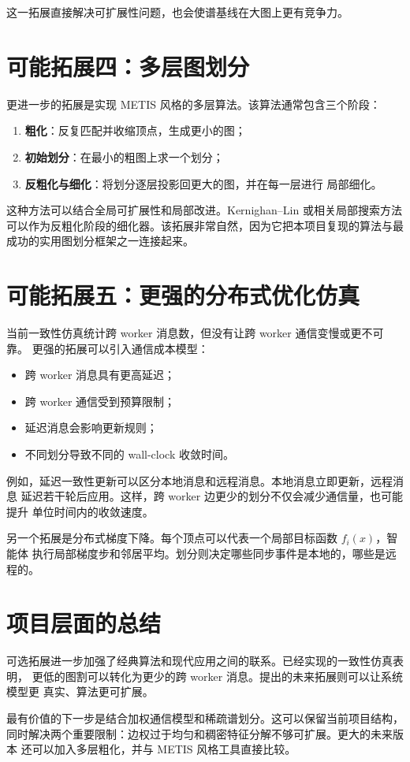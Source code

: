 \documentclass[UTF8, 11pt]{ctexart}
\begin{document}
这一拓展直接解决可扩展性问题，也会使谱基线在大图上更有竞争力。

\section{可能拓展四：多层图划分}

更进一步的拓展是实现 METIS 风格的多层算法。该算法通常包含三个阶段：
\begin{enumerate}
    \item \textbf{粗化}：反复匹配并收缩顶点，生成更小的图；
    \item \textbf{初始划分}：在最小的粗图上求一个划分；
    \item \textbf{反粗化与细化}：将划分逐层投影回更大的图，并在每一层进行
    局部细化。
\end{enumerate}

这种方法可以结合全局可扩展性和局部改进。Kernighan--Lin 或相关局部搜索方法
可以作为反粗化阶段的细化器。该拓展非常自然，因为它把本项目复现的算法与最
成功的实用图划分框架之一连接起来。

\section{可能拓展五：更强的分布式优化仿真}

当前一致性仿真统计跨 worker 消息数，但没有让跨 worker 通信变慢或更不可靠。
更强的拓展可以引入通信成本模型：
\begin{itemize}
    \item 跨 worker 消息具有更高延迟；
    \item 跨 worker 通信受到预算限制；
    \item 延迟消息会影响更新规则；
    \item 不同划分导致不同的 wall-clock 收敛时间。
\end{itemize}

例如，延迟一致性更新可以区分本地消息和远程消息。本地消息立即更新，远程消息
延迟若干轮后应用。这样，跨 worker 边更少的划分不仅会减少通信量，也可能提升
单位时间内的收敛速度。

另一个拓展是分布式梯度下降。每个顶点可以代表一个局部目标函数 $f_i(x)$，智能体
执行局部梯度步和邻居平均。划分则决定哪些同步事件是本地的，哪些是远程的。

\section{项目层面的总结}

可选拓展进一步加强了经典算法和现代应用之间的联系。已经实现的一致性仿真表明，
更低的图割可以转化为更少的跨 worker 消息。提出的未来拓展则可以让系统模型更
真实、算法更可扩展。

最有价值的下一步是结合加权通信模型和稀疏谱划分。这可以保留当前项目结构，
同时解决两个重要限制：边权过于均匀和稠密特征分解不够可扩展。更大的未来版本
还可以加入多层粗化，并与 METIS 风格工具直接比较。
\end{document}
